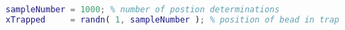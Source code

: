 \begin{lstlisting}[language=matlab]
sampleNumber = 1000; % number of postion determinations
xTrapped     = randn( 1, sampleNumber ); % position of bead in trap

\end{lstlisting}